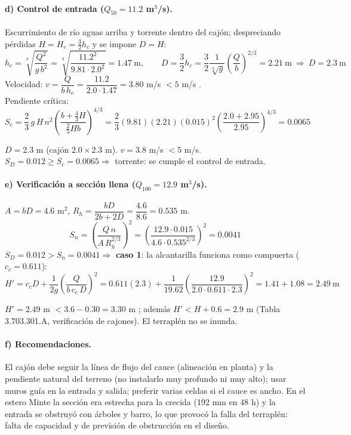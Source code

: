 \documentclass[11pt,letterpaper]{article}
\begin{document}
\paragraph{d) Control de entrada ($Q_{50}=11.2$ m$^3$/s).} Escurrimiento de río aguas arriba y
torrente dentro del cajón; despreciando pérdidas $H=H_c=\tfrac32h_c$ y se impone $D=H$:
\[
h_c=\sqrt[3]{\frac{Q^2}{g\,b^2}}=\sqrt[3]{\frac{11.2^2}{9.81\cdot2.0^2}}=1.47\ \text{m},\qquad
D=\frac32h_c=\frac{3}{2}\frac{1}{\sqrt[3]{g}}\left(\frac Qb\right)^{2/3}=2.21\ \text{m}\ \Rightarrow\ D=2.3\ \text{m}
\]
Velocidad: $v=\dfrac{Q}{b\,h_c}=\dfrac{11.2}{2.0\cdot1.47}=3.80$ m/s $<5$ m/s \checkmark.\\
Pendiente crítica:
\[
S_c=\frac23\,g\,H\,n^2\left(\frac{b+\frac43H}{\frac23Hb}\right)^{4/3}
=\frac23(9.81)(2.21)(0.015)^2\left(\frac{2.0+2.95}{2.95}\right)^{4/3}=0.0065
\]
\begin{resp}$D=2.3$ m (cajón $2.0\times2.3$ m). $v=3.8$ m/s $<5$ m/s. $S_D=0.012\ge S_c=0.0065\Rightarrow$ torrente:
se cumple el control de entrada.\end{resp}

\paragraph{e) Verificación a sección llena ($Q_{100}=12.9$ m$^3$/s).}
$A=bD=4.6$ m$^2$, $R_h=\dfrac{bD}{2b+2D}=\dfrac{4.6}{8.6}=0.535$ m.
\[
S_n=\left(\frac{Q\,n}{A\,R_h^{2/3}}\right)^2=\left(\frac{12.9\cdot0.015}{4.6\cdot0.535^{2/3}}\right)^2=0.0041
\]
$S_D=0.012>S_n=0.0041\Rightarrow$ \textbf{caso 1}: la alcantarilla funciona como compuerta ($c_c=0.611$):
\[
H'=c_cD+\frac{1}{2g}\left(\frac{Q}{b\,c_c\,D}\right)^2=0.611(2.3)+\frac{1}{19.62}\left(\frac{12.9}{2.0\cdot0.611\cdot2.3}\right)^2
=1.41+1.08=2.49\ \text{m}
\]
\begin{resp}$H'=2.49$ m $<3.6-0.30=3.30$ m \checkmark; además $H'<H+0.6=2.9$ m (Tabla 3.703.301.A,
verificación de cajones). El terraplén no se inunda.\end{resp}

\paragraph{f) Recomendaciones.} El cajón debe seguir la línea de flujo del cauce (alineación en planta) y la
pendiente natural del terreno (no instalarlo muy profundo ni muy alto); usar muros guía en la entrada y
salida; preferir varias celdas si el cauce es ancho. En el estero Minte la sección era estrecha para la
crecida (192 mm en 48 h) y la entrada se obstruyó con árboles y barro, lo que provocó la falla del terraplén:
falta de capacidad y de previsión de obstrucción en el diseño.
\end{document}
